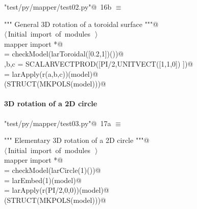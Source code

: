 \documentclass[11pt,oneside]{article}	%
\begin{document}
\begin{flushleft} \small \label{scrap34}
\protect{}\verb@"test/py/mapper/test02.py"@\nobreak\ {\footnotesize 16b }$\equiv$
\vspace{-1ex}
\begin{list}{}{} \item
\mbox{}\verb@""" General 3D rotation of a toroidal surface """@\\
\mbox{}\verb@@\hbox{$\langle\,$Initial import of modules\nobreak\ {\footnotesize {}}$\,\rangle$}\verb@@\\
\mbox{}\verb@from mapper import *@\\
\mbox{}\verb@model = checkModel(larToroidal([0.2,1])())@\\
\mbox{}\verb@a,b,c = SCALARVECTPROD([PI/2,UNITVECT([1,1,0]) ])@\\
\mbox{}\verb@model = larApply(r(a,b,c))(model)@\\
\mbox{}\verb@VIEW(STRUCT(MKPOLS(model)))@\\
\mbox{}\verb@@{\NWsep}
\end{list}
\vspace{-2ex}
\end{flushleft}


\paragraph{3D rotation of a 2D circle}

\begin{flushleft} \small \label{scrap35}
\protect{}\verb@"test/py/mapper/test03.py"@\nobreak\ {\footnotesize 17a }$\equiv$
\vspace{-1ex}
\begin{list}{}{} \item
\mbox{}\verb@""" Elementary 3D rotation of a 2D circle """@\\
\mbox{}\verb@@\hbox{$\langle\,$Initial import of modules\nobreak\ {\footnotesize {}}$\,\rangle$}\verb@@\\
\mbox{}\verb@from mapper import *@\\
\mbox{}\verb@model = checkModel(larCircle(1)())@\\
\mbox{}\verb@model = larEmbed(1)(model)@\\
\mbox{}\verb@model = larApply(r(PI/2,0,0))(model)@\\
\mbox{}\verb@VIEW(STRUCT(MKPOLS(model)))@\\
\mbox{}\verb@@{\NWsep}
\end{list}
\vspace{-2ex}
\end{flushleft}
\end{document}

